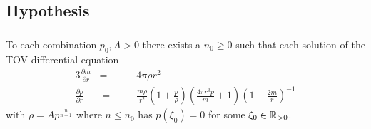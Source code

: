 \subsection{Hypothesis}
\begin{frame}
	\frametitle{\insertsubsection}
	\begin{theorem}
		To each combination $p_0,A>0$ there exists a $n_0\geq0$ such that each solution of the TOV differential equation
		\begin{alignat*}{3}
			\frac{\partial m}{\partial r} &= &&4\pi\rho r^2\\
			\frac{\partial p}{\partial r} &= -&&\frac{m\rho}{r^2}\left(1+\frac{p}{\rho}\right)\left(\frac{4\pi r^3p}{m}+1\right)\left(1-\frac{2m}{r}\right)^{-1}
		\end{alignat*}
		with $\rho=Ap^{\frac{n}{n+1}}$ where $n\leq n_0$ has $p(\xi_0)=0$ for some $\xi_0\in\mathbb{R}_{>0}$.
	\end{theorem}
\end{frame}


% 		
